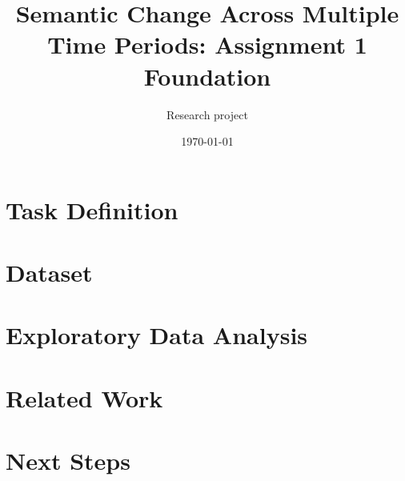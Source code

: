 \documentclass[11pt]{article}
\title{Semantic Change Across Multiple Time Periods: Assignment 1 Foundation}
\author{Research project}
\date{\today}
\begin{document}
\maketitle

\section{Task Definition}


\section{Dataset}


\section{Exploratory Data Analysis}


\section{Related Work}




\section{Next Steps}




\end{document}
